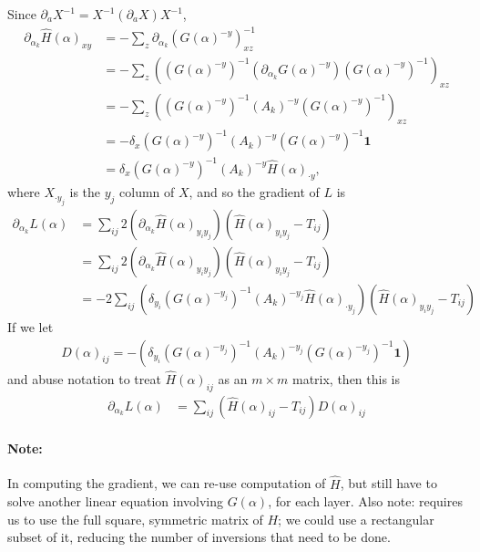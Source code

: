 \documentclass{article}
\newcommand{\bone}{\mathbf{1}}
\begin{document}
Since $\partial_a X^{-1} = X^{-1} (\partial_a X )X^{-1}$,
\begin{align}
  \partial_{\alpha_k} \hat H(\alpha)_{xy} &= - \sum_z \partial_{\alpha_k} (G(\alpha)^{-y})^{-1}_{xz}  \\
  &= - \sum_z \left( (G(\alpha)^{-y})^{-1} \left( \partial_{\alpha_k} G(\alpha)^{-y} \right) (G(\alpha)^{-y})^{-1} \right)_{xz} \\
  &= - \sum_z \left( (G(\alpha)^{-y})^{-1} (A_k)^{-y} (G(\alpha)^{-y})^{-1} \right)_{xz} \\
  &= - \delta_x (G(\alpha)^{-y})^{-1} (A_k)^{-y} (G(\alpha)^{-y})^{-1} \bone \\
  &= \delta_x (G(\alpha)^{-y})^{-1} (A_k)^{-y} \hat H(\alpha)_{\cdot y},
\end{align}
where $X_{\cdot y_j}$ is the $y_j$ column of $X$,
and so the gradient of $L$ is
\begin{align}
  \partial_{\alpha_k} L(\alpha) &= \sum_{ij} 2 \left( \partial_{\alpha_k} \hat H(\alpha)_{y_i y_j} \right) \left( \hat H(\alpha)_{y_i y_j} - T_{ij} \right) \\
  &= \sum_{ij} 2 \left( \partial_{\alpha_k} \hat H(\alpha)_{y_i y_j} \right) \left( \hat H(\alpha)_{y_i y_j} - T_{ij} \right) \\
  &= -2 \sum_{ij} \left( \delta_{y_i} (G(\alpha)^{-y_j})^{-1} (A_k)^{-y_j} \hat H(\alpha)_{\cdot y_j} \right) \left( \hat H(\alpha)_{y_i y_j} - T_{ij} \right)
\end{align}
If we let
\begin{align}
  D(\alpha)_{ij} = - \left( \delta_{y_i} (G(\alpha)^{-y_j})^{-1} (A_k)^{-y_j} (G(\alpha)^{-y_j})^{-1} \bone \right)
\end{align}
and abuse notation to treat $\hat H(\alpha)_{ij}$ as an $m \times m$ matrix, then this is
\begin{align}
  \partial_{\alpha_k} L(\alpha) &= \sum_{ij} ( \hat H(\alpha)_{ij} - T_{ij} ) D(\alpha)_{ij}
\end{align}

\paragraph{Note:}
In computing the gradient, we can re-use computation of $\hat H$,
but still have to solve another linear equation involving $G(\alpha)$,
for each layer.
Also note: requires us to use the full square, symmetric matrix of $H$;
we could use a rectangular subset of it, reducing the number of inversions that need to be done.
\end{document}
